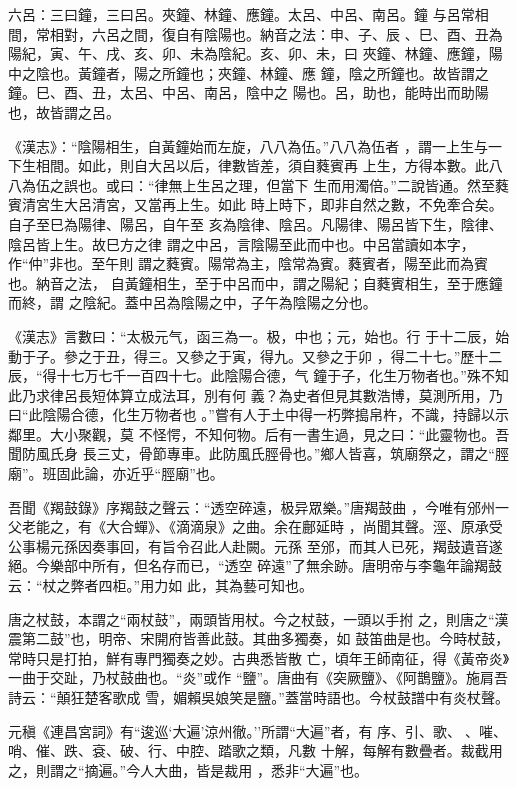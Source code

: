 \documentclass{ctexart}
\begin{document}
六呂：三曰鐘，三曰呂。夾鐘、林鐘、應鐘。太呂、中呂、南呂。鐘 与呂常相間，常相對，六呂之間，復自有陰陽也。納音之法：申、子、辰 、巳、酉、丑為陽紀，寅、午、戌、亥、卯、未為陰紀。亥、卯、未，曰 夾鐘、林鐘、應鐘，陽中之陰也。黃鐘者，陽之所鐘也；夾鐘、林鐘、應 鐘，陰之所鐘也。故皆謂之鐘。巳、酉、丑，太呂、中呂、南呂，陰中之 陽也。呂，助也，能時出而助陽也，故皆謂之呂。

《漢志》：``陰陽相生，自黃鐘始而左旋，八八為伍。''八八為伍者 ，謂一上生与一下生相間。如此，則自大呂以后，律數皆差，須自蕤賓再 上生，方得本數。此八八為伍之誤也。或曰：``律無上生呂之理，但當下 生而用濁倍。''二說皆通。然至蕤賓清宮生大呂清宮，又當再上生。如此 時上時下，即非自然之數，不免牽合矣。自子至巳為陽律、陽呂，自午至 亥為陰律、陰呂。凡陽律、陽呂皆下生，陰律、陰呂皆上生。故巳方之律 謂之中呂，言陰陽至此而中也。中呂當讀如本字，作``仲''非也。至午則 謂之蕤賓。陽常為主，陰常為賓。蕤賓者，陽至此而為賓也。納音之法， 自黃鐘相生，至于中呂而中，謂之陽紀；自蕤賓相生，至于應鐘而終，謂 之陰紀。蓋中呂為陰陽之中，子午為陰陽之分也。

《漢志》言數曰：``太极元气，函三為一。极，中也；元，始也。行 于十二辰，始動于子。參之于丑，得三。又參之于寅，得九。又參之于卯 ，得二十七。''歷十二辰，``得十七万七千一百四十七。此陰陽合德，气 鐘于子，化生万物者也。''殊不知此乃求律呂長短体算立成法耳，別有何 義？為史者但見其數浩博，莫測所用，乃曰``此陰陽合德，化生万物者也 。''嘗有人于土中得一朽弊搗帛杵，不識，持歸以示鄰里。大小聚觀，莫 不怪愕，不知何物。后有一書生過，見之曰：``此靈物也。吾聞防風氏身 長三丈，骨節專車。此防風氏脛骨也。''鄉人皆喜，筑廟祭之，謂之``脛 廟''。班固此論，亦近乎``脛廟''也。

吾聞《羯鼓錄》序羯鼓之聲云：``透空碎遠，极异眾樂。''唐羯鼓曲 ，今唯有邠州一父老能之，有《大合蟬》、《滴滴泉》之曲。余在鄜延時 ，尚聞其聲。涇、原承受公事楊元孫因奏事回，有旨令召此人赴闕。元孫 至邠，而其人已死，羯鼓遺音遂絕。今樂部中所有，但名存而已，``透空 碎遠''了無余跡。唐明帝与李龜年論羯鼓云：``杖之弊者四柜。''用力如 此，其為藝可知也。

唐之杖鼓，本謂之``兩杖鼓''，兩頭皆用杖。今之杖鼓，一頭以手拊 之，則唐之``漢震第二鼓''也，明帝、宋開府皆善此鼓。其曲多獨奏，如 鼓笛曲是也。今時杖鼓，常時只是打拍，鮮有專門獨奏之妙。古典悉皆散 亡，頃年王師南征，得《黃帝炎》一曲于交趾，乃杖鼓曲也。``炎''或作 ``鹽''。唐曲有《突厥鹽》、《阿鵲鹽》。施肩吾詩云：``顛狂楚客歌成 雪，媚賴吳娘笑是鹽。''蓋當時語也。今杖鼓譜中有炎杖聲。

元稹《連昌宮詞》有``逡巡`大遍'涼州徹。''所謂``大遍''者，有 序、引、歌、、嗺、哨、催、跌、袞、破、行、中腔、踏歌之類，凡數 十解，每解有數疊者。裁截用之，則謂之``摘遍。''今人大曲，皆是裁用 ，悉非``大遍''也。
\end{document}

